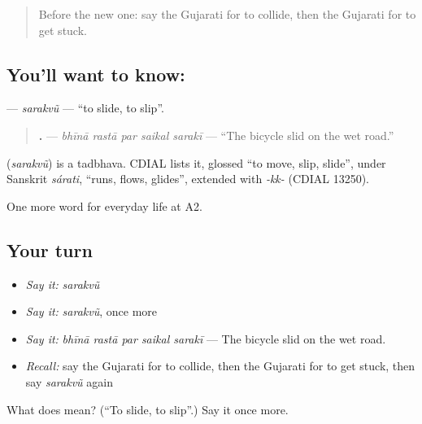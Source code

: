 \label{lesson:GU-C209-sarakvu}



\begin{quote}
Before the new one: say the Gujarati for to collide, then the Gujarati for to get stuck.
\end{quote}

\subsection*{You'll want to know: }
\textbf{} — \emph{sarakvũ} — \textquotedblleft{}to slide, to slip\textquotedblright{}.

\begin{quote}
\textbf{    .} — \emph{bhīnā rastā par saikal sarakī} — \textquotedblleft{}The bicycle slid on the wet road.\textquotedblright{}
\end{quote}

\begin{cousinweb}
\textbf{} (\emph{sarakvũ}) is a tadbhava. CDIAL lists it, glossed \textquotedblleft{}to move, slip, slide\textquotedblright{}, under Sanskrit \emph{sárati}, \textquotedblleft{}runs, flows, glides\textquotedblright{}, extended with \emph{-kk-} (CDIAL 13250).
\end{cousinweb}

\begin{grammarlens}[title={What you've built}]
One more word for everyday life at A2.
\end{grammarlens}

\subsection*{Your turn}
\begin{itemize}
\raggedright
  \item \emph{Say it:} \emph{sarakvũ}
  \item \emph{Say it:} \emph{sarakvũ}, once more
  \item \emph{Say it:} \emph{bhīnā rastā par saikal sarakī} — The bicycle slid on the wet road.
  \item \emph{Recall:} say the Gujarati for to collide, then the Gujarati for to get stuck, then say \emph{sarakvũ} again
\end{itemize}

\begin{tcolorbox}[breakable,colback=teal!4,colframe=teal!35!black,title={Before you move on}]
What does  mean? (\textquotedblleft{}To slide, to slip\textquotedblright{}.) Say it once more.
\end{tcolorbox}
